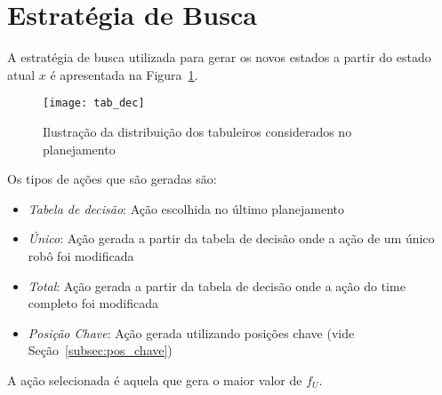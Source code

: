 \section{Estratégia de Busca}\label{sec:est_busca}
A estratégia de busca utilizada para gerar os novos
estados a partir do estado atual $x$ é apresentada na
Figura~\ref{fig:estr_busca}.

\begin{figure}[H]
  \centering
  \texttt{[image: tab\_dec]}
  \caption{Ilustração da distribuição dos tabuleiros
           considerados no planejamento}\label{fig:estr_busca}
\end{figure}

Os tipos de ações que são geradas são:
\begin{itemize}
  \item \textit{Tabela de decisão}: Ação escolhida no último planejamento
  \item \textit{Único}: Ação gerada a partir da tabela de decisão
        onde a ação de um único robô foi modificada
  \item \textit{Total}: Ação gerada a partir da tabela de decisão
        onde a ação do time completo foi modificada
  \item \textit{Posição Chave}: Ação gerada utilizando posições chave
        (vide Seção~\ref{subsec:pos_chave})
\end{itemize}

A ação selecionada é aquela que gera o maior valor de $f_U$.





